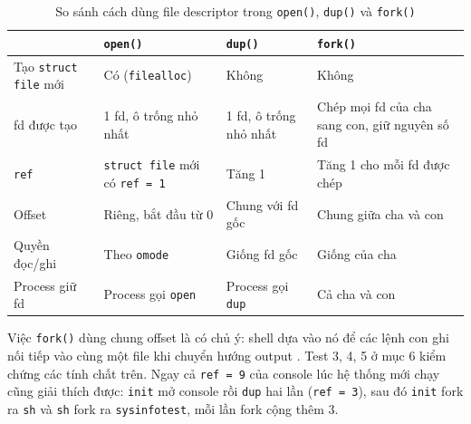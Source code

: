 \begin{table}[H]
\centering
\begin{tabularx}{\textwidth}{|l|X|X|X|}
\hline
 & \textbf{\texttt{open()}} & \textbf{\texttt{dup()}} & \textbf{\texttt{fork()}} \\ \hline
Tạo \texttt{struct file} mới & Có (\texttt{filealloc}) & Không & Không \\ \hline
fd được tạo & 1 fd, ô trống nhỏ nhất & 1 fd, ô trống nhỏ nhất & Chép mọi fd của cha sang con, giữ nguyên số fd \\ \hline
\texttt{ref} & \texttt{struct file} mới có \texttt{ref = 1} & Tăng 1 & Tăng 1 cho mỗi fd được chép \\ \hline
Offset & Riêng, bắt đầu từ 0 & Chung với fd gốc & Chung giữa cha và con \\ \hline
Quyền đọc/ghi & Theo \texttt{omode} & Giống fd gốc & Giống của cha \\ \hline
Process giữ fd & Process gọi \texttt{open} & Process gọi \texttt{dup} & Cả cha và con \\ \hline
\end{tabularx}
\caption{So sánh cách dùng file descriptor trong \texttt{open()}, \texttt{dup()} và \texttt{fork()}}
\end{table}

Việc \texttt{fork()} dùng chung offset là có chủ ý: shell dựa vào nó để các lệnh con ghi nối tiếp vào cùng một file khi chuyển hướng output \cite{xv6book}. Test 3, 4, 5 ở mục 6 kiểm chứng các tính chất trên. Ngay cả \texttt{ref = 9} của console lúc hệ thống mới chạy cũng giải thích được: \texttt{init} mở console rồi \texttt{dup} hai lần (\texttt{ref = 3}), sau đó \texttt{init} fork ra \texttt{sh} và \texttt{sh} fork ra \texttt{sysinfotest}, mỗi lần fork cộng thêm 3.
